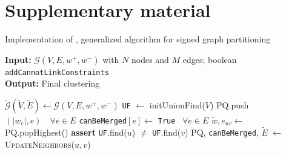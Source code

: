 
\section{Supplementary material}

\begin{algorithm}
  \caption{Implementation of \algname{}, generalized algorithm for signed graph partitioning}
\hspace*{\algorithmicindent} \textbf{Input:} $\mathcal{G}(V,E,w^+,w^-)$ with $N$ nodes and $M$ edges; boolean \texttt{{\color{blue}addCannotLinkConstraints}} \\
\hspace*{\algorithmicindent} \textbf{Output:} Final clustering \\
  \hspace*{\algorithmicindent} 
  \begin{algorithmic}[1]
      \State $\tilde{\mathcal{G}}(\tilde{V},\tilde{E}) \gets \mathcal{G}(V,E,w^+,w^-)$  
      \State \texttt{UF} $\gets$ initUnionFind($V$) 
        \State PQ.push$(|w_e|, e) \quad \forall e \in E $  
        \State \texttt{canBeMerged}$[e] \gets$ \texttt{True} $\,\,\, \forall e\in E$ 
    \State
        \State $\tilde{w}, e_{uv} \gets $ PQ.popHighest() 
        \State \textbf{assert} \texttt{UF}.find($u$) $\neq$ \texttt{UF}.find($v$) 
          \State PQ, \texttt{canBeMerged}, $\tilde{E}$ $\gets$ \textsc{UpdateNeighbors}($u,v$)
          

\end{algorithmic}
\end{algorithm}
